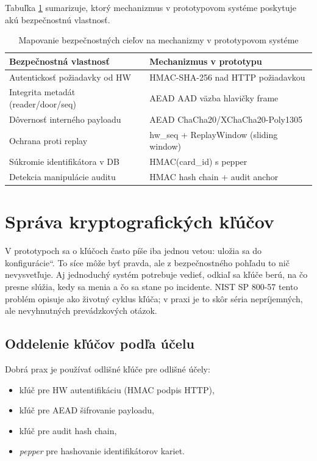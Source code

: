 \documentclass[journal,a4paper,onecolumn]{IEEEtran}
\newcommand{\uv}[1]{\quotedblbase#1\textquotedblleft}
\begin{document}
Tabuľka \ref{tab:security-mapping} sumarizuje, ktorý mechanizmus v prototypovom systéme poskytuje akú bezpečnostnú vlastnosť.

\begin{table}[h]
\renewcommand{\arraystretch}{1.3}
\centering
\begin{tabular}{@{}ll@{}}
\toprule
Bezpečnostná vlastnosť & Mechanizmus v prototypu \\
\midrule
Autentickosť požiadavky od HW & HMAC-SHA-256 nad HTTP požiadavkou \\
Integrita metadát (reader/door/seq) & AEAD AAD väzba hlavičky frame \\
Dôvernosť interného payloadu & AEAD ChaCha20/XChaCha20-Poly1305 \\
Ochrana proti replay & hw\_seq + ReplayWindow (sliding window) \\
Súkromie identifikátora v DB & HMAC(card\_id) s pepper \\
Detekcia manipulácie auditu & HMAC hash chain + audit anchor \\
\bottomrule
\end{tabular}
\caption{Mapovanie bezpečnostných cieľov na mechanizmy v prototypovom systéme}
\label{tab:security-mapping}
\end{table}

\section{Správa kryptografických kľúčov}

V prototypoch sa o kľúčoch často píše iba jednou vetou: \uv{uložia sa do konfigurácie}. To síce môže byť pravda, ale z bezpečnostného pohľadu to nič nevysvetľuje. Aj jednoduchý systém potrebuje vedieť, odkiaľ sa kľúče berú, na čo presne slúžia, kedy sa menia a čo sa stane po incidente. NIST SP 800-57 tento problém opisuje ako životný cyklus kľúča\cite{NIST80057}; v praxi je to skôr séria nepríjemných, ale nevyhnutných prevádzkových otázok.

\subsection{Oddelenie kľúčov podľa účelu}

Dobrá prax je používať odlišné kľúče pre odlišné účely:

\begin{itemize}[leftmargin=*,itemsep=2pt]
  \item kľúč pre HW autentifikáciu (HMAC podpis HTTP),
  \item kľúč pre AEAD šifrovanie payloadu,
  \item kľúč pre audit hash chain,
  \item \emph{pepper} pre hashovanie identifikátorov kariet.
\end{itemize}
\end{document}

